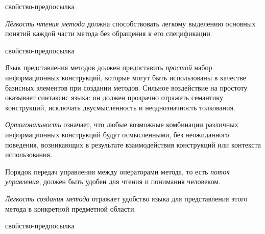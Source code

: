 \begin{SCn}
\begin{scnrelfromlist}{свойство-предпосылка}
\end{scnrelfromlist}
\end{SCn}

\textit{Лёгкость чтения метода} должна способствовать легкому выделению основных понятий каждой части метода без обращения к его спецификации.

\begin{SCn}
\begin{scnrelfromlist}{свойство-предпосылка}
\end{scnrelfromlist}
\end{SCn}

Язык представления методов должен предоставить \textit{простой} набор информационных конструкций, которые могут быть использованы в качестве базисных элементов при создании методов.
Сильное воздействие на простоту оказывает синтаксис языка: он должен прозрачно отражать семантику конструкций, исключать двусмысленность и неоднозначность толкования.

\textit{Ортогональность} означает, что любые возможные комбинации различных информационных конструкций будут осмысленными, без неожиданного поведения, возникающих в результате взаимодействия конструкций или контекста использования.

Порядок передач управления между операторами метода, то есть \textit{поток управления}, должен быть удобен для чтения и понимания человеком.

\textit{Легкость создания метода} отражает удобство языка для представления этого метода в конкретной предметной области.

\begin{SCn}
\begin{scnrelfromlist}{свойство-предпосылка}
\end{scnrelfromlist}
\end{SCn}


